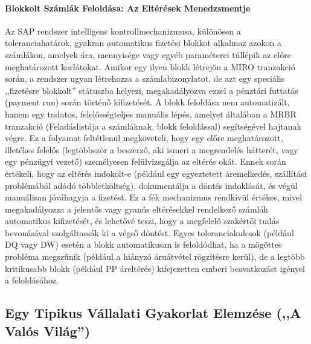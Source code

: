 \paragraph{Blokkolt Számlák Feloldása: Az Eltérések Menedzsmentje \cite{JKE-Supply-Chain-Business-Process}}
Az SAP rendszer intelligens kontrollmechanizmusa, különösen a toleranciahatárok, gyakran automatikus fizetési blokkot alkalmaz azokon a számlákon, amelyek ára, mennyisége vagy egyéb paraméterei túllépik az előre meghatározott korlátokat.
Amikor egy ilyen blokk létrejön a MIRO tranzakció során, a rendszer ugyan létrehozza a számlabizonylatot, de azt egy speciális ,,fizetésre blokkolt'' státuszba helyezi, megakadályozva ezzel a pénztári futtatás (payment run) során történő kifizetését.
A blokk feloldása nem automatizált, hanem egy tudatos, felelősségteljes manuális lépés, amelyet általában a MRBR tranzakció (Feladáslistája a számláknak, blokk feloldással) segítségével hajtanak végre.
Ez a folyamat feltétlenül megköveteli, hogy egy előre meghatározott, illetékes felelős (legtöbbször a beszerző, aki ismeri a megrendelés hátterét, vagy egy pénzügyi vezető) személyesen felülvizsgálja az eltérés okát.
Ennek során értékeli, hogy az eltérés indokolt-e (például egy egyeztetett áremelkedés, szállítási problémából adódó többletköltség), dokumentálja a döntés indoklását, és végül manuálisan jóváhagyja a fizetést.
Ez a fék mechanizmus rendkívül értékes, mivel megakadályozza a jelentős vagy gyanús eltérésekkel rendelkező számlák automatikus kifizetését, és lehetővé teszi, hogy a megfelelő szakértői tudás bevonásával szolgáltassák ki a végső döntést.
Egyes toleranciakulcsok (például DQ vagy DW) esetén a blokk automatikusan is feloldódhat, ha a mögöttes probléma megszűnik (például a hiányzó áruátvétel rögzítésre kerül), de a legtöbb kritikusabb blokk (például PP áreltérés) kifejezetten emberi beavatkozást igényel a feloldásához.


\subsection{Egy Tipikus Vállalati Gyakorlat Elemzése (,,A Valós Világ'')} \label{ssec:valos_vilag}

